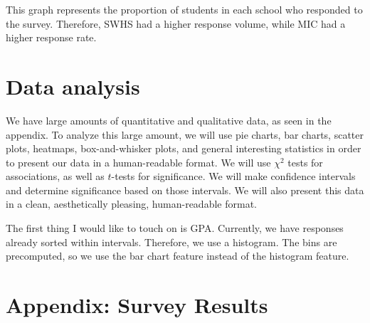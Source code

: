 \documentclass[12pt, letterpaper]{article}
\begin{document}
This graph represents the proportion of students in each school who responded to the survey. Therefore, SWHS had a higher response volume, while MIC had a higher response rate.

\section{Data analysis}

We have large amounts of quantitative and qualitative data, as seen in the appendix. To analyze this large amount, we will use pie charts, bar charts, scatter plots, heatmaps, box-and-whisker plots, and general interesting statistics in order to present our data in a human-readable format. We will use $\chi^2$ tests for associations, as well as $t$-tests for significance. We will make confidence intervals and determine significance based on those intervals. We will also present this data in a clean, aesthetically pleasing, human-readable format.

The first thing I would like to touch on is GPA. Currently, we have responses already sorted within intervals. Therefore, we use a histogram.
The bins are precomputed, so we use the bar chart feature instead of the histogram feature.




\section{Appendix: Survey Results}
\end{document}
